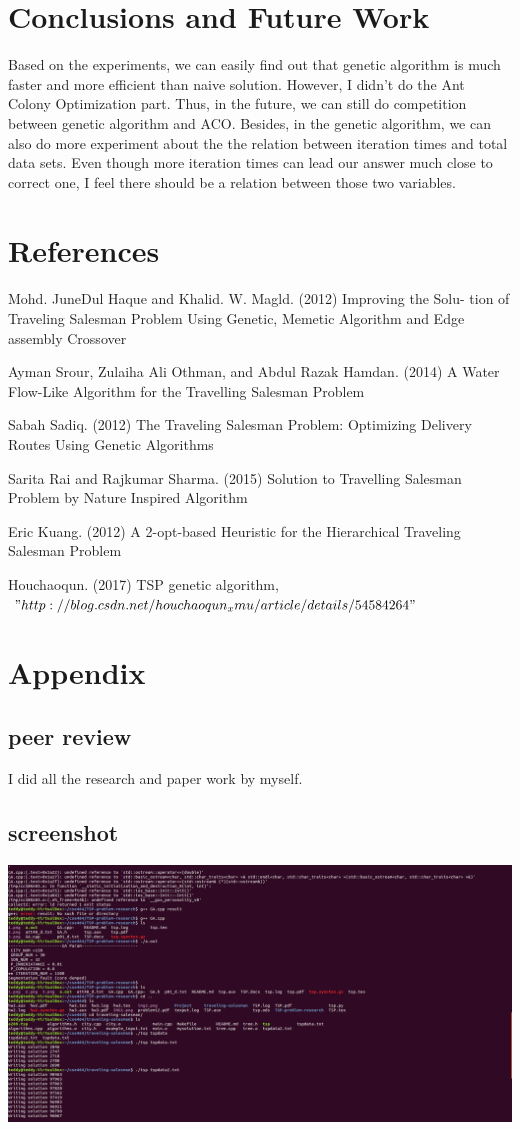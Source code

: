 \documentclass[a4paper,man,natbib]{apa6}
\begin{document}
\section{Conclusions and Future Work}
Based on the experiments, we can easily find out that genetic algorithm is much faster and more efficient than naive solution. However, I didn't do the Ant Colony Optimization part. Thus, in the future, we can still do competition between genetic algorithm and ACO. Besides, in the genetic algorithm, we can also do more experiment about the the relation between iteration times and total data sets. Even though more iteration times can lead our answer much close to correct one, I feel there  should be a relation between those two variables.   
\newpage
\section{References}
Mohd. JuneDul Haque and Khalid. W. Magld. (2012) Improving the Solu-
tion of Traveling Salesman Problem Using Genetic, Memetic Algorithm and
Edge assembly Crossover
 
Ayman Srour, Zulaiha Ali Othman, and Abdul Razak Hamdan. (2014) A
Water Flow-Like Algorithm for the Travelling Salesman Problem

Sabah Sadiq. (2012) The Traveling Salesman Problem: Optimizing Delivery
Routes Using Genetic Algorithms

Sarita Rai and Rajkumar Sharma. (2015) Solution to Travelling Salesman
Problem by Nature Inspired Algorithm

Eric Kuang. (2012) A 2-opt-based Heuristic for the Hierarchical Traveling
Salesman Problem

Houchaoqun. (2017) TSP genetic algorithm, $"http://blog.csdn.net/houchaoqun_xmu/article/details/54584264"$


\newpage
\section{Appendix}
\subsection{peer review}
I did all the research and paper work by myself. 
\subsection{screenshot}
\includegraphics[width=1\linewidth]{4}
\end{document}
